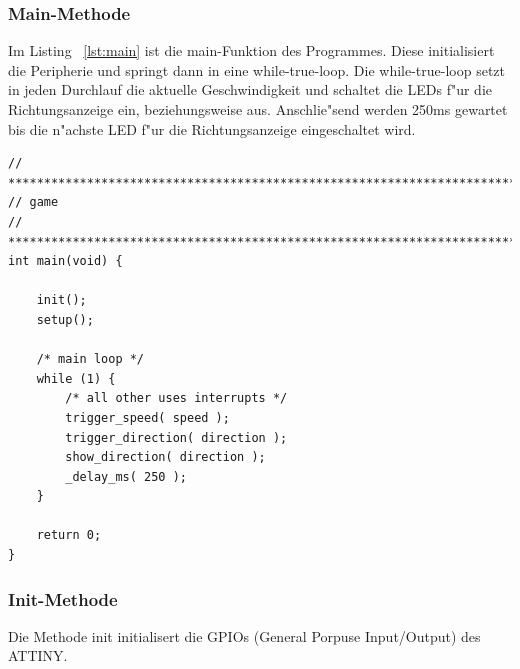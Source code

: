 \subsubsection{Main-Methode}

Im Listing ~\ref{lst:main} ist die main-Funktion des Programmes. Diese initialisiert die Peripherie und springt dann in eine while-true-loop.
Die while-true-loop setzt in jeden Durchlauf die aktuelle Geschwindigkeit und schaltet die LEDs f"ur die Richtungsanzeige ein, beziehungsweise aus. Anschlie"send werden 250ms gewartet bis die n"achste LED f"ur die Richtungsanzeige eingeschaltet wird. 

\vspace{0.5cm}
\begin{lstlisting}[caption={Main-Method},label=lst:main]
// ****************************************************************************
// game
// ***************************************************************************/
int main(void) {

	init();
	setup();

	/* main loop */
	while (1) {
		/* all other uses interrupts */
		trigger_speed( speed );
		trigger_direction( direction );
		show_direction( direction );
		_delay_ms( 250 );
	}

	return 0;
}
\end{lstlisting}
\vspace{0.5cm}

\subsubsection{Init-Methode}

Die Methode init initialisert die GPIOs (General Porpuse Input/Output) des ATTINY.

